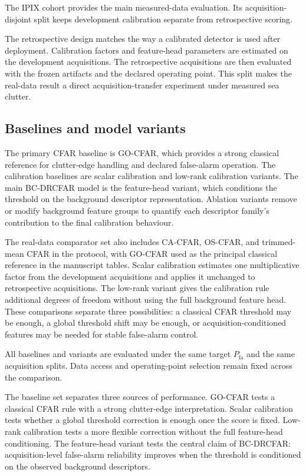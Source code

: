 \documentclass[preprint,12pt]{elsarticle}
\begin{document}
The IPIX cohort provides the main measured-data evaluation. Its
acquisition-disjoint split keeps development calibration separate from
retrospective scoring.

The retrospective design matches the way a calibrated detector is used after
deployment. Calibration factors and feature-head parameters are estimated on the
development acquisitions. The retrospective acquisitions are then evaluated with
the frozen artifacts and the declared operating point. This split makes the
real-data result a direct acquisition-transfer experiment under measured sea
clutter.

\subsection{Baselines and model variants}
\label{subsec:baselines}

The primary CFAR baseline is GO-CFAR, which provides a strong classical
reference for clutter-edge handling and declared false-alarm operation. The
calibration baselines are scalar calibration and low-rank calibration variants.
The main BC-DRCFAR model is the feature-head variant, which conditions the
threshold on the background descriptor representation. Ablation variants remove
or modify background feature groups to quantify each descriptor family's
contribution to the final calibration behaviour.

The real-data comparator set also includes CA-CFAR, OS-CFAR, and trimmed-mean
CFAR in the protocol, with GO-CFAR used as the principal classical reference in
the manuscript tables. Scalar calibration estimates one multiplicative factor
from the development acquisitions and applies it unchanged to retrospective
acquisitions. The low-rank variant gives the calibration rule additional
degrees of freedom without using the full background feature head. These
comparisons separate three possibilities: a classical CFAR threshold may be
enough, a global threshold shift may be enough, or acquisition-conditioned
features may be needed for stable false-alarm control.

All baselines and variants are evaluated under the same target
$P_{\mathrm{fa}}$ and the same acquisition splits. Data access and
operating-point selection remain fixed across the comparison.

The baseline set separates three sources of performance. GO-CFAR tests a
classical CFAR rule with a strong clutter-edge interpretation. Scalar
calibration tests whether a global threshold correction is enough once the
score is fixed. Low-rank calibration tests a more flexible correction without
the full feature-head conditioning. The feature-head variant tests the central
claim of BC-DRCFAR: acquisition-level false-alarm reliability improves when the
threshold is conditioned on the observed background descriptors.
\end{document}

